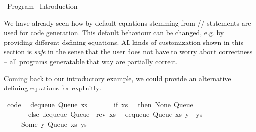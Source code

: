 %
\begin{isabellebody}%
\def\isabellecontext{Program}%
%
\isadelimtheory
%
\endisadelimtheory
%
\isatagtheory
{}\isamarkupfalse%
\ Program\isanewline
{}\ Introduction\isanewline
{}%
\endisatagtheory
{\isafoldtheory}%
%
\isadelimtheory
%
\endisadelimtheory
%
\isamarkuptrue%
%
\isamarkuptrue%
%
\begin{isamarkuptext}%
We have already seen how by default equations stemming from
  \hyperlink{command.definition}{\mbox{}}/\hyperlink{command.primrec}{\mbox{}}/\hyperlink{command.fun}{\mbox{}}
  statements are used for code generation.  This default behaviour
  can be changed, e.g. by providing different defining equations.
  All kinds of customization shown in this section is \emph{safe}
  in the sense that the user does not have to worry about
  correctness -- all programs generatable that way are partially
  correct.%
\end{isamarkuptext}%
\isamarkuptrue%
%
\isamarkuptrue%
%
\begin{isamarkuptext}%
Coming back to our introductory example, we
  could provide an alternative defining equations for 
  explicitly:%
\end{isamarkuptext}%
\isamarkuptrue%
%
\isadelimquote
%
\endisadelimquote
%
\isatagquote
{}\isamarkupfalse%
\ {\isacharbrackleft}code{\isacharbrackright}{\isacharcolon}\isanewline
\ \ {\isachardoublequoteopen}dequeue\ {\isacharparenleft}Queue\ xs\ {\isacharbrackleft}{\isacharbrackright}{\isacharparenright}\ {\isacharequal}\isanewline
\ \ \ \ \ {\isacharparenleft}if\ xs\ {\isacharequal}\ {\isacharbrackleft}{\isacharbrackright}\ then\ {\isacharparenleft}None{\isacharcomma}\ Queue\ {\isacharbrackleft}{\isacharbrackright}\ {\isacharbrackleft}{\isacharbrackright}{\isacharparenright}\isanewline
\ \ \ \ \ \ \ else\ dequeue\ {\isacharparenleft}Queue\ {\isacharbrackleft}{\isacharbrackright}\ {\isacharparenleft}rev\ xs{\isacharparenright}{\isacharparenright}{\isacharparenright}{\isachardoublequoteclose}\isanewline
\ \ {\isachardoublequoteopen}dequeue\ {\isacharparenleft}Queue\ xs\ {\isacharparenleft}y\ {\isacharhash}\ ys{\isacharparenright}{\isacharparenright}\ {\isacharequal}\isanewline
\ \ \ \ \ {\isacharparenleft}Some\ y{\isacharcomma}\ Queue\ xs\ ys{\isacharparenright}{\isachardoublequoteclose}\isanewline

\end{isabellebody}

